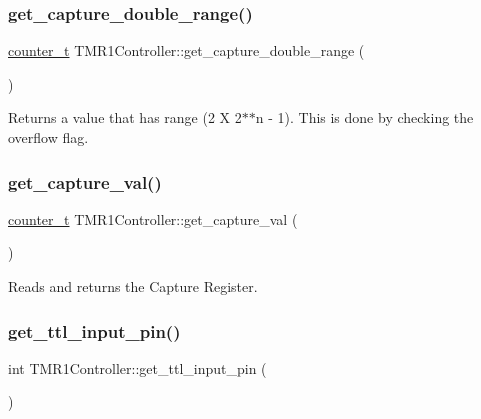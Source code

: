 \subsubsection{\texorpdfstring{get\+\_\+capture\+\_\+double\+\_\+range()}{get\_capture\_double\_range()}}
{\footnotesize\ttfamily \hyperlink{types_8hpp_ac89ac912f524b3e3fa3720ea55fec966}{counter\+\_\+t} T\+M\+R1\+Controller\+::get\+\_\+capture\+\_\+double\+\_\+range (\begin{DoxyParamCaption}{ }\end{DoxyParamCaption})}



Returns a value that has range (2 X 2$\ast$$\ast$n -\/ 1). This is done by checking the overflow flag. 

\mbox{\label{classTMR1Controller_a3d07eed72365e7a7b44fadefb23b9ba6}} 
\subsubsection{\texorpdfstring{get\+\_\+capture\+\_\+val()}{get\_capture\_val()}}
{\footnotesize\ttfamily \hyperlink{types_8hpp_ac89ac912f524b3e3fa3720ea55fec966}{counter\+\_\+t} T\+M\+R1\+Controller\+::get\+\_\+capture\+\_\+val (\begin{DoxyParamCaption}{ }\end{DoxyParamCaption})\hspace{0.3cm}{\ttfamily [inline]}}



Reads and returns the Capture Register. 

\mbox{\label{classTMR1Controller_a084c153e1a888f72456c54b29e3fa957}} 
\subsubsection{\texorpdfstring{get\+\_\+ttl\+\_\+input\+\_\+pin()}{get\_ttl\_input\_pin()}}
{\footnotesize\ttfamily int T\+M\+R1\+Controller\+::get\+\_\+ttl\+\_\+input\+\_\+pin (\begin{DoxyParamCaption}{ }\end{DoxyParamCaption})\hspace{0.3cm}{\ttfamily [inline]}}



